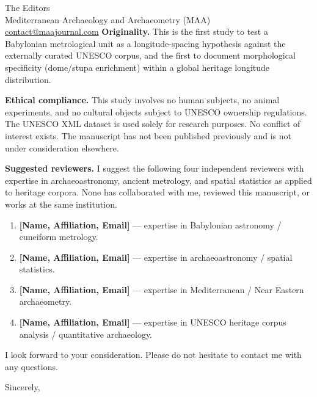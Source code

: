 \documentclass[12pt,a4paper]{letter}
\begin{document}
\begin{letter}{The Editors\\
Mediterranean Archaeology and Archaeometry (MAA)\\
\href{mailto:contact@maajournal.com}{contact@maajournal.com}}
\textbf{Originality.}
This is the first study to test a Babylonian metrological unit as a
longitude-spacing hypothesis against the externally curated UNESCO corpus,
and the first to document morphological specificity (dome/stupa enrichment)
within a global heritage longitude distribution.

\textbf{Ethical compliance.}
This study involves no human subjects, no animal experiments, and no
cultural objects subject to UNESCO ownership regulations. The UNESCO
XML dataset is used solely for research purposes. No conflict of interest
exists. The manuscript has not been published previously and is not under
consideration elsewhere.

\textbf{Suggested reviewers.}
I suggest the following four independent reviewers with expertise in
archaeoastronomy, ancient metrology, and spatial statistics as applied to
heritage corpora. None has collaborated with me, reviewed this manuscript,
or works at the same institution.

\begin{enumerate}
  \item \textbf{[Name, Affiliation, Email]} ---
        expertise in Babylonian astronomy / cuneiform metrology.
  \item \textbf{[Name, Affiliation, Email]} ---
        expertise in archaeoastronomy / spatial statistics.
  \item \textbf{[Name, Affiliation, Email]} ---
        expertise in Mediterranean / Near Eastern archaeometry.
  \item \textbf{[Name, Affiliation, Email]} ---
        expertise in UNESCO heritage corpus analysis / quantitative archaeology.
\end{enumerate}

%
%
%

I look forward to your consideration. Please do not hesitate to contact me
with any questions.

\closing{Sincerely,}

\end{letter}
\end{document}

